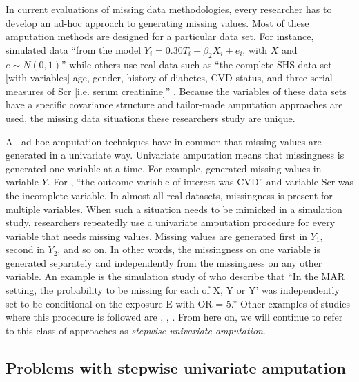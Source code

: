 \documentclass[11pt,a4paper]{article}
\begin{document}
In current evaluations of missing data methodologies, every researcher has to develop an ad-hoc approach to generating missing values. Most of these amputation methods are designed for a particular data set. For instance, \citet[][p. 4]{Sullivan2016} simulated data ``from the model $Y_i = 0.30T_i + \beta_2X_i + e_i$, with $X$ and $e \sim N(0, 1)$'' while others use real data such as ``the complete SHS data set [with variables] age, gender, history of diabetes, CVD status, and three serial measures of Scr [i.e. serum creatinine]'' \citep[][p. 3]{Shara2015}. Because the variables of these data sets have a specific covariance structure and tailor-made amputation approaches are used, the missing data situations these researchers study are unique.

All ad-hoc amputation techniques have in common that missing values are generated in a univariate way. Univariate amputation means that missingness is generated one variable at a time. For example, \citet{Sullivan2016} generated missing values in variable $Y$. For \citet[][p. 3]{Shara2015}, ``the outcome variable of interest was CVD'' and variable Scr was the incomplete variable. 
In almost all real datasets, missingness is present for multiple variables. When such a situation needs to be mimicked in a simulation study, researchers repeatedly use a univariate amputation procedure for every variable that needs missing values. Missing values are generated first in $Y_1$, second in $Y_2$, and so on. In other words, the missingness on one variable is generated separately and independently from the missingness on any other variable. An example is the simulation study of \citet[][p. 3]{Kontopantelis2017} who describe that ``In the MAR setting, the probability to be missing for each of X, Y or Y' was independently set to be conditional on the exposure E with OR = 5.'' Other examples of studies where this procedure is followed are \citet{Abrahantes2011}, \citet{Kalaycioglu2016}, \citet{Pastor2003}. From here on, we will continue to refer to this class of approaches as \textit{stepwise univariate amputation}.

\subsection{\normalsize Problems with stepwise univariate amputation}\label{problems}
\end{document}
